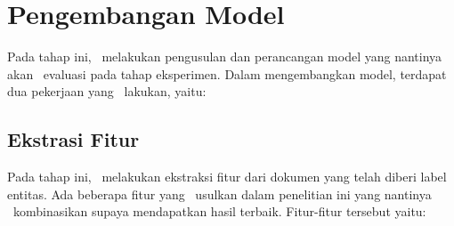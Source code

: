 \section{Pengembangan Model}
Pada tahap ini, \saya~melakukan pengusulan dan perancangan model yang nantinya akan \saya~evaluasi pada tahap eksperimen. Dalam mengembangkan model, terdapat dua pekerjaan yang \saya~lakukan, yaitu:

\subsection{Ekstrasi Fitur}\label{subbab:fitur}
Pada tahap ini, \saya~melakukan ekstraksi fitur dari dokumen yang telah diberi label entitas. Ada beberapa fitur yang \saya~usulkan dalam penelitian ini yang nantinya \saya~kombinasikan supaya mendapatkan hasil terbaik. Fitur-fitur tersebut yaitu:
